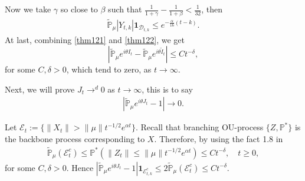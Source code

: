 \documentclass[12pt, a4paper]{amsart}
\theoremstyle{definition}
\numberwithin{equation}{section}
\begin{document}
Now we take $\gamma$ so close to $\beta$ such that $\frac{1}{1+\gamma}-\frac{1}{1+\beta}<\frac{1}{32}$, then 
\begin{align}
     \mathbb{\tilde{P}}_{\mu}|Y_{t,k}|\mathbf{1}_{\mathcal{D}_{t,k}}\leq  e^{-\frac{\alpha}{16}(t-k)}.\label{thm122}
\end{align}
At last, combining \eqref{thm121} and \eqref{thm122}, we get 
$$\left|\mathbb{\tilde{P}}_{\mu}e^{i\theta I_t}-\mathbb{\tilde{P}}_{\mu}e^{i\theta\tilde{I}_t}\right|\leq C t^{-\delta},$$
for some $C,\delta>0$, which tend to zero, as $t\rightarrow \infty$.

Next, we will prove $J_t \rightarrow^d 0$ as $t\rightarrow \infty$, this is to say
\begin{align*}
    \left|\mathbb{\tilde{P}}_{\mu}e^{i\theta J_t}-1\right|\rightarrow 0.
\end{align*}

Let $\mathcal{E}_t:=\{\|X_t\|>\|\mu\|t^{-1/2}e^{\alpha t}\}$. Recall that branching OU-process $\{Z,\mathbb{P}^{\ast}\}$ is the backbone process corresponding to $X$. Therefore, by using the fact 1.8 in \cite{MM}
\begin{align}
    \mathbb{\tilde{P}}_{\mu}(\mathcal{E}^c_t)\leq\mathbb{P}^{\ast}(\|Z_t\|\leq\|\mu\|t^{-1/2}e^{\alpha t})\leq C t^{-\delta}, \quad t\geq0,\label{Theorem123}
\end{align}
    for some $C,\delta>0$. Hence $\left|\mathbb{\tilde{P}}_{\mu}e^{i\theta J_t}-1\right|\mathbf{1}_{\mathcal{E}^c_{t,k}}\leq 2\mathbb{\tilde{P}}_{\mu}(\mathcal{E}^c_t)\leq Ct^{-\delta}$.
\end{document}
